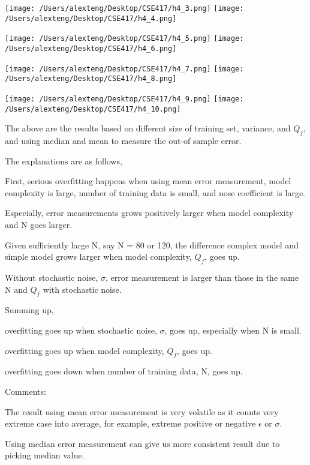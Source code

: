 \documentclass[11pt]{article}
\begin{document}
\begin{enumerate}
\texttt{[image: /Users/alexteng/Desktop/CSE417/h4\_3.png]}
\texttt{[image: /Users/alexteng/Desktop/CSE417/h4\_4.png]}

\texttt{[image: /Users/alexteng/Desktop/CSE417/h4\_5.png]}
\texttt{[image: /Users/alexteng/Desktop/CSE417/h4\_6.png]}

\texttt{[image: /Users/alexteng/Desktop/CSE417/h4\_7.png]}
\texttt{[image: /Users/alexteng/Desktop/CSE417/h4\_8.png]}

\texttt{[image: /Users/alexteng/Desktop/CSE417/h4\_9.png]}
\texttt{[image: /Users/alexteng/Desktop/CSE417/h4\_10.png]}

The above are the results based on different size of training set, variance, and $Q_f$, and using median and mean to measure the out-of sample error.

The explanations are as follows,

First, serious overfitting happens when using mean error measurement, model complexity is large, number of training data is small, and nose coefficient is large. 

Especially, error measurements grows positively larger when model complexity and N goes larger. 

Given sufficiently large N, say N = 80 or 120, the difference complex model and simple model grows larger when model complexity, $Q_f$, goes up.

Without stochastic noise, $\sigma$, error measurement is larger than those in the same N and $Q_f$ with stochastic noise.

Summing up, 

overfitting goes up when stochastic noise, $\sigma$, goes up, especially when N is small.

overfitting goes up when model complexity, $Q_f$, goes up.

overfitting goes down when number of training data, N, goes up.

Comments:

The result using mean error measurement is very volatile as it counts very extreme case into average, for example, extreme positive or negative $\epsilon$ or $\sigma$.

Using median error measurement can give us more consistent result due to picking median value.

\pagebreak


\end{enumerate}
\end{document}
